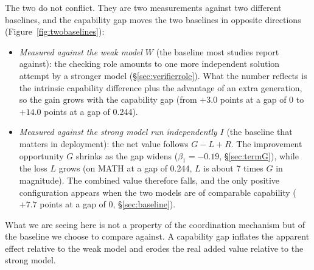 \documentclass[11pt,a4paper]{article}
\begin{document}
The two do not conflict. They are two measurements against two different baselines, and the capability gap
moves the two baselines in opposite directions (Figure~\ref{fig:twobaselines}):
\begin{itemize}\itemsep2pt
\item \emph{Measured against the weak model $W$} (the baseline most studies report against): the
      checking role amounts to one more independent solution attempt by a stronger model
      (\S\ref{sec:verifierrole}). What the number reflects is the intrinsic capability difference plus the
      advantage of an extra generation, so the gain grows with the capability gap (from $+3.0$ points
      at a gap of 0 to $+14.0$ points at a gap of 0.244).
\item \emph{Measured against the strong model run independently $I$} (the baseline that matters in
      deployment): the net value follows $G - L + R$. The improvement opportunity $G$ shrinks as the
      gap widens ($\beta_1 = -0.19$, \S\ref{sec:termG}), while the loss $L$ grows (on MATH at a gap of
      0.244, $L$ is about 7 times $G$ in magnitude). The combined value therefore falls, and the only
      positive configuration appears when the two models are of comparable capability ($+7.7$ points at
      a gap of 0, \S\ref{sec:baseline}).
\end{itemize}
What we are seeing here is not a property of the coordination mechanism but of the baseline we choose to
compare against. A capability gap inflates the apparent effect relative to the weak model and erodes the
real added value relative to the strong model.
\end{document}
